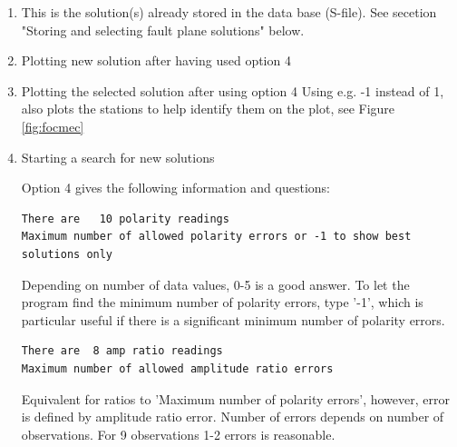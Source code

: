 \begin{enumerate}
\item
This is the solution(s) already stored in the data base (S-file). 
See secetion "Storing and selecting fault plane solutions" below.
\item
Plotting new solution after having used option 4 
\item
Plotting the selected solution after using option 4 \newline
Using e.g. -1 instead of 1, also plots the stations to 
help identify them on the plot, see Figure \ref{fig:focmec} 
\item
Starting a search for new solutions 

Option 4 gives the following information and questions: 

\begin{verbatim}
There are   10 polarity readings
Maximum number of allowed polarity errors or -1 to show best solutions only
\end{verbatim}

Depending on number of data values, 0-5 is a good answer. To let the program find the minimum number of polarity errors, type '-1', which is particular useful if there is a significant minimum number of polarity errors.

\begin{verbatim}
There are  8 amp ratio readings
Maximum number of allowed amplitude ratio errors
\end{verbatim}

Equivalent for ratios to 'Maximum number of polarity errors', however, error is defined by amplitude ratio error. Number of errors depends on number of observations. For 9 observations 1-2 errors is reasonable.


\end{enumerate}

